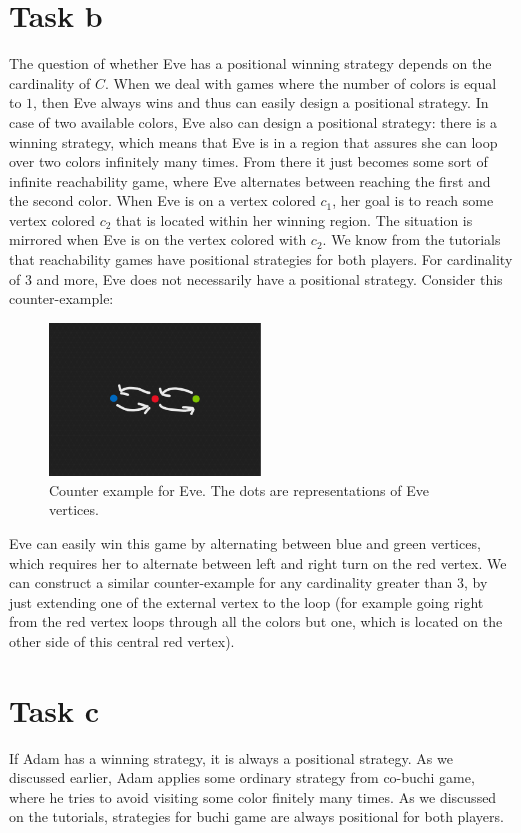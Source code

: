 \documentclass{article}
\begin{document}
\section{Task b}
The question of whether Eve has a positional winning strategy depends on the cardinality of $C$. When we deal with games where the number of colors is equal to $1$, then Eve always wins and thus can easily design a positional strategy. In case of two available colors, Eve also can design a positional strategy: there is a winning strategy, which means that Eve is in a region that assures she can loop over two colors infinitely many times. From there it just becomes some sort of infinite reachability game, where Eve alternates between reaching the first and the second color. When Eve is on a vertex colored $c_{1}$, her goal is to reach some vertex colored $c_{2}$ that is located within her winning region. The situation is mirrored when Eve is on the vertex colored with $c_{2}$. We know from the tutorials that reachability games have positional strategies for both players. For cardinality of $3$ and more, Eve does not necessarily have a positional strategy. Consider this counter-example:

\begin{figure}[h]
\centering
\includegraphics[width=0.5\textwidth]{2Positional.png}
\caption{\label{fig:counter}Counter example for Eve. The dots are representations of Eve vertices.}
\end{figure}

Eve can easily win this game by alternating between blue and green vertices, which requires her to alternate between left and right turn on the red vertex. We can construct a similar counter-example for any cardinality greater than $3$, by just extending one of the external vertex to the loop (for example going right from the red vertex loops through all the colors but one, which is located on the other side of this central red vertex).

\section{Task c}

If Adam has a winning strategy, it is always a positional strategy. As we discussed earlier, Adam applies some ordinary strategy from co-buchi game, where he tries to avoid visiting some color finitely many times. As we discussed on the tutorials, strategies for buchi game are always positional for both players.
\end{document}
